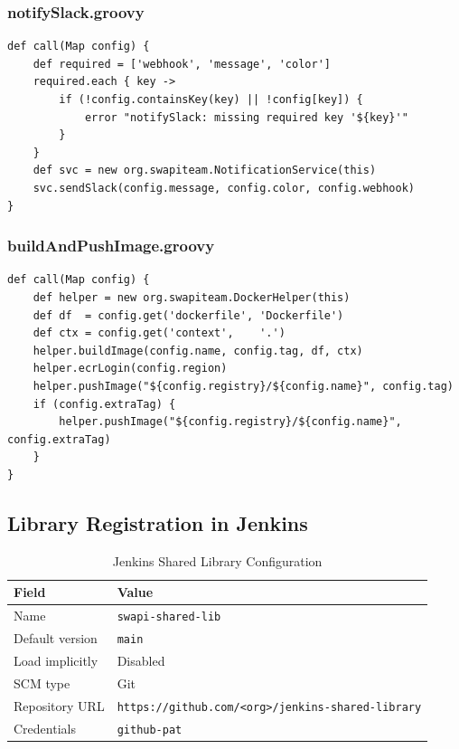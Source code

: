 \documentclass[12pt,a4paper]{article}
\begin{document}
\subsubsection{notifySlack.groovy}
\begin{lstlisting}[caption={notifySlack global variable}, label={lst:notify}]
def call(Map config) {
    def required = ['webhook', 'message', 'color']
    required.each { key ->
        if (!config.containsKey(key) || !config[key]) {
            error "notifySlack: missing required key '${key}'"
        }
    }
    def svc = new org.swapiteam.NotificationService(this)
    svc.sendSlack(config.message, config.color, config.webhook)
}
\end{lstlisting}

\subsubsection{buildAndPushImage.groovy}
\begin{lstlisting}[caption={buildAndPushImage global variable}, label={lst:dockerpush}]
def call(Map config) {
    def helper = new org.swapiteam.DockerHelper(this)
    def df  = config.get('dockerfile', 'Dockerfile')
    def ctx = config.get('context',    '.')
    helper.buildImage(config.name, config.tag, df, ctx)
    helper.ecrLogin(config.region)
    helper.pushImage("${config.registry}/${config.name}", config.tag)
    if (config.extraTag) {
        helper.pushImage("${config.registry}/${config.name}", config.extraTag)
    }
}
\end{lstlisting}

\subsection{Library Registration in Jenkins}

\begin{table}[H]
  \centering
  \caption{Jenkins Shared Library Configuration}
  \label{tab:sharedlib}
  \begin{tabularx}{\linewidth}{lX}
    \toprule
    \textbf{Field} & \textbf{Value} \\
    \midrule
    Name                & \texttt{swapi-shared-lib} \\
    Default version     & \texttt{main} \\
    Load implicitly     & Disabled \\
    SCM type            & Git \\
    Repository URL      & \texttt{https://github.com/<org>/jenkins-shared-library} \\
    Credentials         & \texttt{github-pat} \\
    \bottomrule
  \end{tabularx}
\end{table}
\end{document}
